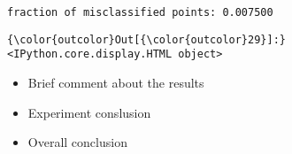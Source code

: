 \documentclass[11pt]{article}
\providecommand{\tightlist}{%
      \setlength{\itemsep}{0pt}\setlength{\parskip}{0pt}}
\begin{document}
    \begin{Verbatim}[commandchars=\\\{\}]
fraction of misclassified points: 0.007500

    \end{Verbatim}

\begin{Verbatim}[commandchars=\\\{\}]
{\color{outcolor}Out[{\color{outcolor}29}]:} <IPython.core.display.HTML object>
\end{Verbatim}
            
    \begin{itemize}
\item
  Brief comment about the results
\item
  Experiment conslusion
\end{itemize}

    \begin{itemize}
\tightlist
\item
  Overall conclusion
\end{itemize}


    
    
    
    
\end{document}
